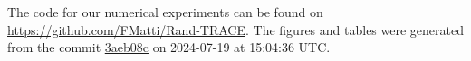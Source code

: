 The code for our numerical experiments can be found on \url{https://github.com/FMatti/Rand-TRACE}. The figures and tables were generated from the commit \href{https://github.com/FMatti/Rand-TRACE/tree/3aeb08c}{3aeb08c} on 2024-07-19 at 15:04:36 UTC.
